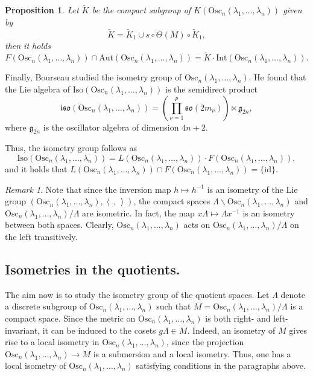\documentclass[12pt]{amsart}
\newcommand{\lela}{\left \langle}
\newcommand{\rira}{\right \rangle}
\theoremstyle{plain}
\newtheorem{prop}[thm]{Proposition}
\theoremstyle{definition}
\theoremstyle{remark}
\newtheorem{rem}{Remark}
\begin{document}
\begin{prop}
    Let \( \tilde{K} \) be the compact subgroup of \( K(\text{Osc}_n(\lambda_1, \ldots, \lambda_n)) \) given by
    \[
    \tilde{K} = \tilde{K}_1 \cup s \circ \Theta(M) \circ \tilde{K}_1,
    \]
    then it holds
    \[
    F(\text{Osc}_n(\lambda_1, \ldots, \lambda_n)) \cap \text{Aut}(\text{Osc}_n(\lambda_1, \ldots, \lambda_n)) = \tilde{K} \cdot \text{Int}(\text{Osc}_n(\lambda_1, \ldots, \lambda_n)).
    \]
\end{prop}

Finally, Bourseau studied the isometry group of \( \text{Osc}_n(\lambda_1, \ldots, \lambda_n) \). He found that the Lie algebra of \( \text{Iso}(\text{Osc}_n(\lambda_1, \ldots, \lambda_n)) \) is the semidirect product
\[
\mathfrak{iso}(\text{Osc}_n(\lambda_1, \ldots, \lambda_n)) = \left(\prod_{\nu=1}^p \mathfrak{so}(2m_{\nu})\right) \ltimes \mathfrak{g}_{2n},
\]
where \( \mathfrak{g}_{2n} \) is the oscillator algebra of dimension \( 4n+2 \).

Thus, the isometry group follows as
\[
\text{Iso}(\text{Osc}_n(\lambda_1, \ldots, \lambda_n)) = L(\text{Osc}_n(\lambda_1, \ldots, \lambda_n)) \cdot F(\text{Osc}_n(\lambda_1, \ldots, \lambda_n)),
\]
and it holds that \( L(\text{Osc}_n(\lambda_1, \ldots, \lambda_n)) \cap F(\text{Osc}_n(\lambda_1, \ldots, \lambda_n)) = \{ \text{id} \} \).



\begin{rem}
    Note that since the inversion map \( h \mapsto h^{-1} \) is an isometry of the Lie group \( (\text{Osc}_n(\lambda_1, \ldots, \lambda_n), \lela \,,\, \rira) \), the compact spaces \( \Lambda \backslash \text{Osc}_n(\lambda_1, \ldots, \lambda_n) \) and \( \text{Osc}_n(\lambda_1, \ldots, \lambda_n)/\Lambda \) are isometric. In fact, the map \( x\Lambda \mapsto \Lambda x^{-1} \) is an isometry between both spaces. Clearly, \( \text{Osc}_n(\lambda_1, \ldots, \lambda_n) \) acts on \( \text{Osc}_n(\lambda_1, \ldots, \lambda_n)/\Lambda \) on the left transitively.
\end{rem}

\subsection{Isometries in the quotients.}

The aim now is to study the isometry group of the quotient spaces. Let \( \Lambda \) denote a discrete subgroup of \( \text{Osc}_n(\lambda_1, \ldots, \lambda_n) \) such that \( M = \text{Osc}_n(\lambda_1, \ldots, \lambda_n)/\Lambda \) is a compact space. Since the metric on \( \text{Osc}_n(\lambda_1, \ldots, \lambda_n) \) is both right- and left-invariant, it can be induced to the cosets \( g\Lambda \in M \). Indeed, an isometry of \( M \) gives rise to a local isometry in \( \text{Osc}_n(\lambda_1, \ldots, \lambda_n) \), since the projection \( \text{Osc}_n(\lambda_1, \ldots, \lambda_n) \to M \) is a submersion and a local isometry. Thus, one has a local isometry of \( \text{Osc}_n(\lambda_1, \ldots, \lambda_n) \) satisfying conditions in the paragraphs above.
\end{document}
